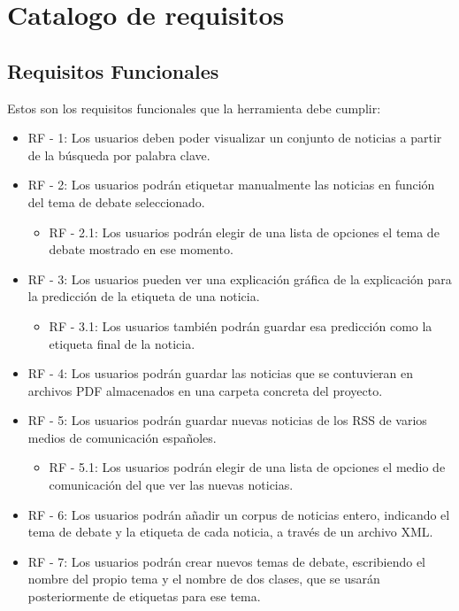 \section{Catalogo de requisitos}

\subsection{Requisitos Funcionales}

Estos son los requisitos funcionales que la herramienta debe cumplir:

\begin{itemize}

\item RF - 1: Los usuarios deben poder visualizar un conjunto de noticias a partir de la búsqueda por palabra clave.

\item RF - 2: Los usuarios podrán etiquetar manualmente las noticias en función del tema de debate seleccionado.
\begin{itemize}
\item RF - 2.1: Los usuarios podrán elegir de una lista de opciones el tema de debate mostrado en ese momento.
\end{itemize}

\item RF - 3: Los usuarios pueden ver una explicación gráfica de la explicación para la predicción de la etiqueta de una noticia.
\begin{itemize}
\item RF - 3.1: Los usuarios también podrán guardar esa predicción como la etiqueta final de la noticia.
\end{itemize}

\item RF - 4: Los usuarios podrán guardar las noticias que se contuvieran en archivos PDF almacenados en una carpeta concreta del proyecto.

\item RF - 5: Los usuarios podrán guardar nuevas noticias de 
los RSS de varios medios de comunicación españoles.
\begin{itemize}
\item RF - 5.1: Los usuarios podrán elegir de una lista de opciones el medio de comunicación del que ver las nuevas noticias.
\end{itemize}

\item RF - 6: Los usuarios podrán añadir un corpus de noticias entero, indicando el tema de debate y la etiqueta de cada noticia, a través de un archivo XML.

\item RF - 7: Los usuarios podrán crear nuevos temas de debate, escribiendo el nombre del propio tema y el nombre de dos clases, que se usarán posteriormente de etiquetas para ese tema.

\end{itemize}


